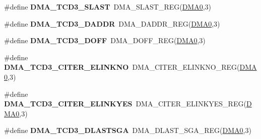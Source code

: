 \begin{DoxyCompactItemize}
\item 
\#define {\bfseries D\+M\+A\+\_\+\+T\+C\+D3\+\_\+\+S\+L\+A\+ST}~D\+M\+A\+\_\+\+S\+L\+A\+S\+T\+\_\+\+R\+EG(\hyperlink{group__DMA__Peripheral__Access__Layer_ga4103044f9ca209772f513dc694513ffb}{D\+M\+A0},3)\hypertarget{group__DMA__Register__Accessor__Macros_gae3a5b45233b7f24c770759413cbbb8bd}{}\label{group__DMA__Register__Accessor__Macros_gae3a5b45233b7f24c770759413cbbb8bd}

\item 
\#define {\bfseries D\+M\+A\+\_\+\+T\+C\+D3\+\_\+\+D\+A\+D\+DR}~D\+M\+A\+\_\+\+D\+A\+D\+D\+R\+\_\+\+R\+EG(\hyperlink{group__DMA__Peripheral__Access__Layer_ga4103044f9ca209772f513dc694513ffb}{D\+M\+A0},3)\hypertarget{group__DMA__Register__Accessor__Macros_ga00d0aa21f0dc3f9be0643931ee4af148}{}\label{group__DMA__Register__Accessor__Macros_ga00d0aa21f0dc3f9be0643931ee4af148}

\item 
\#define {\bfseries D\+M\+A\+\_\+\+T\+C\+D3\+\_\+\+D\+O\+FF}~D\+M\+A\+\_\+\+D\+O\+F\+F\+\_\+\+R\+EG(\hyperlink{group__DMA__Peripheral__Access__Layer_ga4103044f9ca209772f513dc694513ffb}{D\+M\+A0},3)\hypertarget{group__DMA__Register__Accessor__Macros_ga20dd71cc6246dba8d54263a5244d8462}{}\label{group__DMA__Register__Accessor__Macros_ga20dd71cc6246dba8d54263a5244d8462}

\item 
\#define {\bfseries D\+M\+A\+\_\+\+T\+C\+D3\+\_\+\+C\+I\+T\+E\+R\+\_\+\+E\+L\+I\+N\+K\+NO}~D\+M\+A\+\_\+\+C\+I\+T\+E\+R\+\_\+\+E\+L\+I\+N\+K\+N\+O\+\_\+\+R\+EG(\hyperlink{group__DMA__Peripheral__Access__Layer_ga4103044f9ca209772f513dc694513ffb}{D\+M\+A0},3)\hypertarget{group__DMA__Register__Accessor__Macros_gac7f6258ced19b6d5b2589bb46ab8014d}{}\label{group__DMA__Register__Accessor__Macros_gac7f6258ced19b6d5b2589bb46ab8014d}

\item 
\#define {\bfseries D\+M\+A\+\_\+\+T\+C\+D3\+\_\+\+C\+I\+T\+E\+R\+\_\+\+E\+L\+I\+N\+K\+Y\+ES}~D\+M\+A\+\_\+\+C\+I\+T\+E\+R\+\_\+\+E\+L\+I\+N\+K\+Y\+E\+S\+\_\+\+R\+EG(\hyperlink{group__DMA__Peripheral__Access__Layer_ga4103044f9ca209772f513dc694513ffb}{D\+M\+A0},3)\hypertarget{group__DMA__Register__Accessor__Macros_ga4a8907e1cd9237bc52b3f58c16389781}{}\label{group__DMA__Register__Accessor__Macros_ga4a8907e1cd9237bc52b3f58c16389781}

\item 
\#define {\bfseries D\+M\+A\+\_\+\+T\+C\+D3\+\_\+\+D\+L\+A\+S\+T\+S\+GA}~D\+M\+A\+\_\+\+D\+L\+A\+S\+T\+\_\+\+S\+G\+A\+\_\+\+R\+EG(\hyperlink{group__DMA__Peripheral__Access__Layer_ga4103044f9ca209772f513dc694513ffb}{D\+M\+A0},3)\hypertarget{group__DMA__Register__Accessor__Macros_ga5a4b16e69f639dffe7081c7e8b083cbe}{}\label{group__DMA__Register__Accessor__Macros_ga5a4b16e69f639dffe7081c7e8b083cbe}


\end{DoxyCompactItemize}
